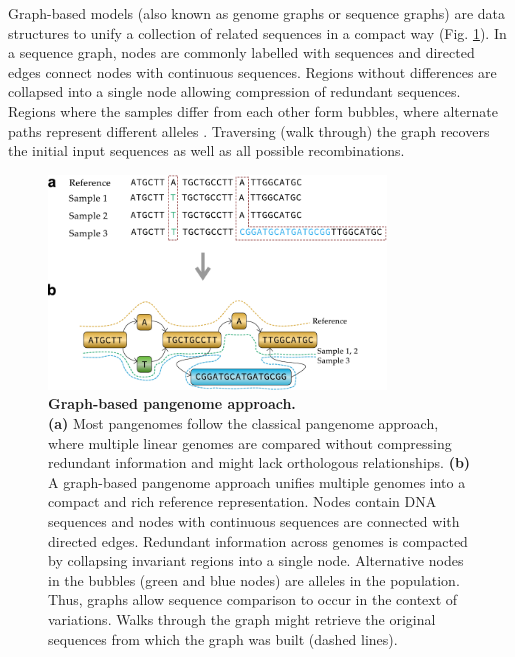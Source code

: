 \documentclass[../main.tex]{subfiles}
\begin{document}
Graph-based models (also known as genome graphs or sequence graphs) are data structures to unify a collection of related sequences in a compact way (Fig. \ref{fig14:graph}). In a sequence graph, nodes are commonly labelled with sequences and directed edges connect nodes with continuous sequences. Regions without differences are collapsed into a single node allowing compression of redundant sequences. Regions where the samples differ from each other form bubbles, where alternate paths represent different alleles \citep{paten2018superbubbles}. Traversing (walk through) the graph recovers the initial input sequences as well as all possible recombinations. \\


\begin{figure}[!htb]
    \centering
    \includegraphics[width=0.8\textwidth]{intro/fig4.pdf}
        \vspace{3mm}
        \caption[Graph-based pangenome approach]{\textbf{Graph-based pangenome approach.} \\
        \footnotesize{\textbf{(a)} Most pangenomes follow the classical pangenome approach, where multiple linear genomes are compared without compressing redundant information and might lack orthologous relationships. \textbf{(b)} A graph-based pangenome approach unifies multiple genomes into a compact and rich reference representation. Nodes contain DNA sequences and nodes with continuous sequences are connected with directed edges. Redundant information across genomes is compacted by collapsing invariant regions into a single node. Alternative nodes in the bubbles (green and blue nodes) are alleles in the population. Thus, graphs allow sequence comparison to occur in the context of variations. Walks through the graph might retrieve the original sequences from which the graph was built (dashed lines).}}
        \label{fig14:graph}
\end{figure}
\end{document}
